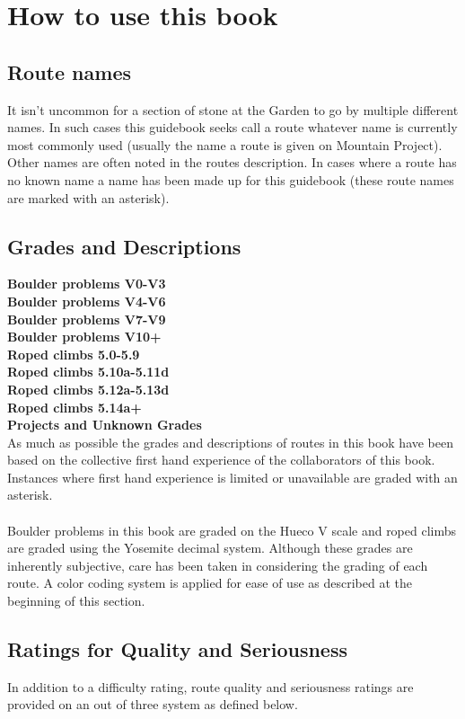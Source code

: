 \section{How to use this book}
\subsection*{Route names}
It isn't uncommon for a section of stone at the Garden to go by multiple different names. In such cases this guidebook seeks call a route whatever name is currently most commonly used (usually the name a route is given on Mountain Project). Other names are often noted in the routes description. In cases where a route has no known name a name has been made up for this guidebook (these route names are marked with an asterisk).
\subsection*{Grades and Descriptions}
\colorbox{green!20}{\textbf{Boulder problems V0-V3}}\\
\colorbox{RoyalBlue!20}{\textbf{Boulder problems V4-V6}}\\
\colorbox{Goldenrod!50}{\textbf{Boulder problems V7-V9}}\\
\colorbox{red!20}{\textbf{Boulder problems V10+}}\\
\colorbox{green!20}{\textbf{Roped climbs 5.0-5.9}}\\
\colorbox{RoyalBlue!20}{\textbf{Roped climbs 5.10a-5.11d}}\\
\colorbox{Goldenrod!50}{\textbf{Roped climbs 5.12a-5.13d}}\\
\colorbox{red!20}{\textbf{Roped climbs 5.14a+}}\\
\colorbox{black!20}{\textbf{Projects and Unknown Grades}}\\
As much as possible the grades and descriptions of routes in this book have been based on the collective first hand experience of the collaborators of this book. Instances where first hand experience is limited or unavailable are graded with an asterisk.\\
\\
Boulder problems in this book are graded on the Hueco V scale and roped climbs are graded using the Yosemite decimal system. Although these grades are inherently subjective, care has been taken in considering the grading of each route. A color coding system is applied for ease of use as described at the beginning of this section.\\
\subsection*{Ratings for Quality and Seriousness}
In addition to a difficulty rating, route quality and seriousness ratings are provided on an out of three system as defined below.
